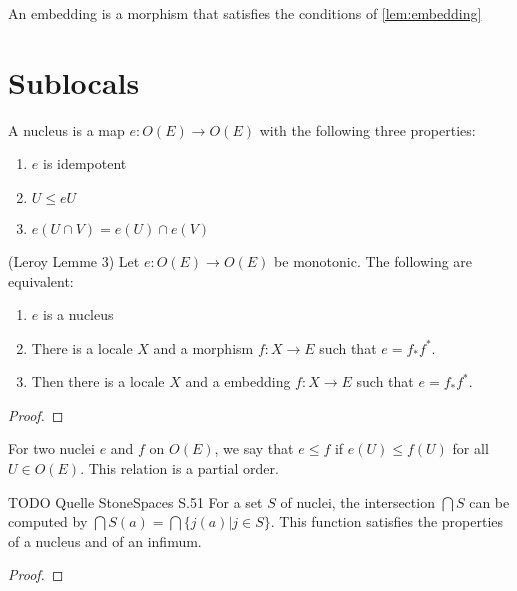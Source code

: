 \begin{definition}[Embedding]
    \label{def:embedding}
    An embedding is a morphism that satisfies the conditions of \cref{lem:embedding}
    \leanok
\end{definition}


\section{Sublocals}
\begin{definition}[Nucleus]
    \label{def:nucleus}
    \mathlibok
    A nucleus is a map $e : O(E) \rightarrow O(E)$ with the following three properties:
    \begin{enumerate}
        \item $e$ is idempotent
        \item $U \le e U$
        \item $e(U \cap V) = e(U) \cap e(V)$
    \end{enumerate}
\end{definition}

\begin{lemma}[Nucleus]
(Leroy Lemme 3)
    \label{lem:nucleus}
    \leanok
    Let $e : O(E) \rightarrow O(E)$ be monotonic. The following are equivalent:
    \begin{enumerate}
        \item $e$ is a nucleus
        \item There is a locale $X$ and a morphism $f: X \rightarrow E$ such that $e = f_*f^*$.
        \item Then there is a locale $X$ and a embedding $f: X \rightarrow E$ such that $e = f_*f^*$.
    \end{enumerate}
\end{lemma}
\begin{proof}
    \leanok
\end{proof}

\begin{definition}
    \label{def:nucleus_partial_order}
    \mathlibok
    \leanok
    For two nuclei $e$ and $f$ on $O(E)$, we say that $e \le f$ if $e(U) \le f(U)$ for all $U \in O(E)$.
    This relation is a partial order.
\end{definition}

\begin{lemma} 
    \label{lem:nucleus_intersection}
    \mathlibok
    \leanok
    TODO Quelle StoneSpaces S.51
    For a set $S$ of nuclei, the intersection $\bigcap S$ can be computed by $\bigcap S(a) = \bigcap \{j(a) | j \in S \}$.
    This function satisfies the properties of a nucleus and of an infimum.
\end{lemma}
\begin{proof}
    \leanok
\end{proof}


